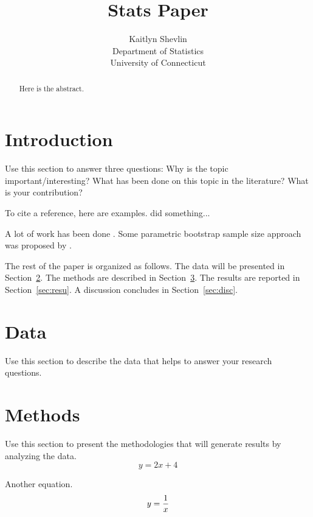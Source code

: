 \documentclass[12pt]{article}
\title{Stats Paper}
\author{Kaitlyn Shevlin\\
  Department of Statistics\\
  University of Connecticut
}
\begin{document}
\maketitle

\begin{abstract}
Here is the abstract.  
\end{abstract}


\section{Introduction}
\label{sec:intro}

Use this section to answer three questions:
Why is the topic important/interesting?
What has been done on this topic in the literature?
What is your contribution?

\lipsum[1-3]

To cite a reference, here are examples.
\citet{xie2015dynamic} did something... \lipsum[1]

A lot of work has been done \citep[e.g.,][]{xie2015dynamic}.
\lipsum[2]
Some parametric bootstrap sample size approach was proposed by
\citet{dwivedi2017analysis}. 


The rest of the paper is organized as follows.
The data will be presented in Section~\ref{sec:data}.
The methods are described in Section~\ref{sec:meth}.
The results are reported in Section~\ref{sec:resu}.
A discussion concludes in Section~\ref{sec:disc}.


\section{Data}
\label{sec:data}

Use this section to describe the data that helps to answer your research questions.

\section{Methods}
\label{sec:meth}

Use this section to present the methodologies that will generate results by
analyzing the data.
\begin{equation}
  \label{eq:line}
  y = 2x + 4 
\end{equation}

Another equation.
\begin{equation}
  \label{eq:line}
y = {1\over\displaystyle x}
\end{equation}
\end{document}
